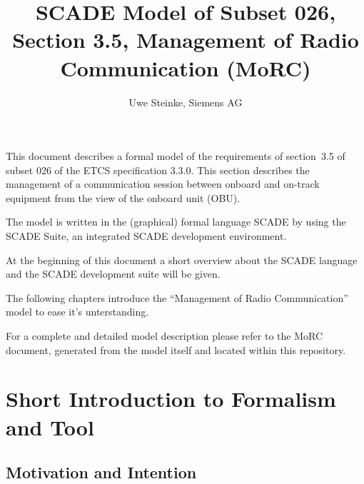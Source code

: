 \documentclass{template/openetcs_article}
\begin{document}
\frontmatter
{}





\author{Uwe Steinke, Siemens AG}


\title{SCADE Model of Subset 026, Section 3.5, Management of Radio Communication (MoRC)}





\maketitle
\tableofcontents
\listoffiguresandtables
\newpage

This document describes a formal model of the requirements of section~3.5 of
subset 026 of the ETCS specification 3.3.0. This section 
describes the management of a communication session between onboard and
on-track equipment from the view of the onboard unit (OBU).

The model is written in the (graphical) formal language SCADE by using the 
SCADE Suite, an integrated SCADE development environment. 

At the beginning of this document a short overview about the SCADE language and the SCADE development suite will be given. 

The following chapters introduce the "`Management of Radio Communication"' model to ease it's unterstanding. 

For a complete and detailed model description please refer to the MoRC document, generated from the model itself and located within this repository.

\newpage

\section{Short Introduction to Formalism and Tool}
\label{sec:short-intr-form}

\subsection{Motivation and Intention}
\label{sec:MotivationAndIntention}
\end{document}
